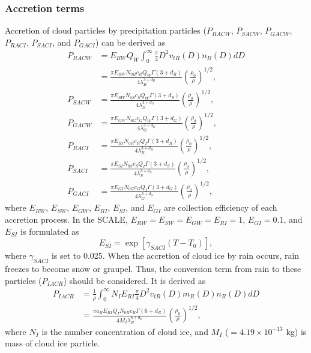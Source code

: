 \subsubsection{Accretion terms}
Accretion of cloud particles by precipitation particles ($P_{RACW}$, $P_{SACW}$, $P_{GACW}$, $P_{RACI}$, $P_{SACI}$, and $P_{GACI}$) can be derived as
\begin{align}
  P_{RACW} &=E_{RW}Q_{W}\int_{0}^{\infty}\frac{\pi}{4}D^{2}v_{tR}(D)n_{R}(D)dD \nonumber \\
  &=\frac{\pi E_{RW}N_{0R}c_{R}Q_{W}\Gamma(3+d_{R})}{4\lambda^{3+d_{R}}_{R}}\left(\frac{\rho_{0}}{\rho}\right)^{1/2}, \\
  P_{SACW} &=\frac{\pi E_{SW}N_{0S}c_{S}Q_{W}\Gamma(3+d_{S})}{4\lambda^{3+d_{S}}_{S}}\left(\frac{\rho_{0}}{\rho}\right)^{1/2}, \\
  P_{GACW} &=\frac{\pi E_{GW}N_{0G}c_{G}Q_{W}\Gamma(3+d_{G})}{4\lambda^{3+d_{G}}_{G}}\left(\frac{\rho_{0}}{\rho}\right)^{1/2}, \\
  P_{RACI} &=\frac{\pi E_{RI}N_{0R}c_{R}Q_{I}\Gamma(3+d_{R})}{4\lambda^{3+d_{R}}_{R}}\left(\frac{\rho_{0}}{\rho}\right)^{1/2}, \\
  P_{SACI} &=\frac{\pi E_{SI}N_{0S}c_{S}Q_{I}\Gamma(3+d_{S})}{4\lambda^{3+d_{S}}_{S}}\left(\frac{\rho_{0}}{\rho}\right)^{1/2}, \\
  P_{GACI} &=\frac{\pi E_{GI}N_{0G}c_{G}Q_{I}\Gamma(3+d_{G})}{4\lambda^{3+d_{G}}_{G}}\left(\frac{\rho_{0}}{\rho}\right)^{1/2},
\end{align}
where $E_{RW}$, $E_{SW}$, $E_{GW}$, $E_{RI}$, $E_{SI}$, and $E_{GI}$ are collection efficiency of each accretion process. In the SCALE, $E_{RW} = E_{SW} = E_{GW} = E_{RI} = 1$, $E_{GI} = 0.1$, and $E_{SI}$ is formulated as
\begin{equation}
  E_{SI}=\exp[\gamma_{SACI}(T-T_{0})],
\end{equation}
where $\gamma_{SACI}$ is set to 0.025.
When the accretion of cloud ice by rain occurs, rain freezes to become snow or graupel.
Thus, the conversion term from rain to these particles ($P_{IACR}$) should be considered.
It is derived as
\begin{align}
  P_{IACR}&=\frac{1}{\rho}\int_{0}^{\infty}N_{I}E_{RI}\frac{\pi}{4}D^{2}v_{tR}(D)m_{R}(D)n_{R}(D)dD \nonumber \\
  &=\frac{\pi a_{R}E_{RI}Q_{I}N_{0R}c_{R}\Gamma(6+d_{R})}{4M_{I}\lambda^{6+d_{R}}_{R}}\left(\frac{\rho_{0}}{\rho}\right)^{1/2},
\end{align}
where $N_{I}$ is the number concentration of cloud ice, and $M_{I}$ ($=4.19\times10^{-13}$ kg) is mass of cloud ice particle.

